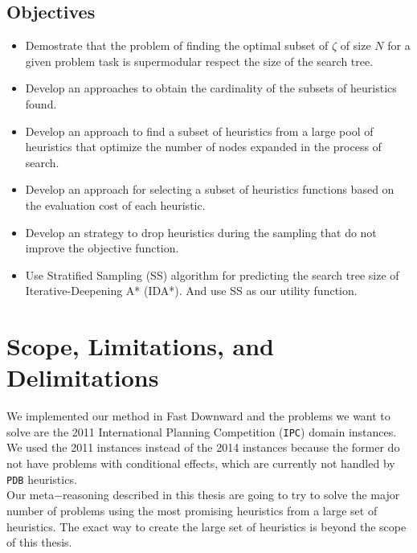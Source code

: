 \subsection{Objectives}
\noindent

\begin{itemize}
  \item Demostrate that the problem of finding the optimal subset of $\zeta$ of size $N$ for a given problem task is supermodular respect the size of the search tree.

  \item Develop an approaches to obtain the cardinality of the subsets of heuristics found.
  
  \item Develop an approach to find a subset of heuristics from a large pool of heuristics that optimize the number of nodes expanded in the process of search.
  
  \item Develop an approach for selecting a subset of heuristics functions based on the evaluation cost of each heuristic.
  
  \item Develop an strategy to drop heuristics during the sampling that do not improve the objective function.  
  
  \item Use Stratified Sampling (SS) algorithm for predicting the search tree size of Iterative-Deepening A* (IDA*). And use SS as our utility function.
   
\end{itemize}
\section{Scope, Limitations, and Delimitations}
\noindent
We implemented our method in Fast Downward \cite{helmert2006fast} and the problems we want to solve are the 2011 International Planning Competition (\texttt{IPC}) domain instances.\\

We used the 2011 instances instead of the 2014 instances because the former do not have problems with conditional effects, which are currently not handled by \texttt{PDB} heuristics.\\

Our meta$-$reasoning described in this thesis are going to try to solve the major number of problems using the most promising heuristics from a large set of heuristics. The exact way to create the large set of heuristics is beyond the scope of this thesis.

